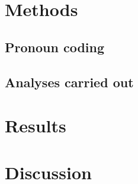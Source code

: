   \section{Methods}
    \subsection{Pronoun coding}
    \subsection{Analyses carried out}
  \section{Results}
  \section{Discussion}
